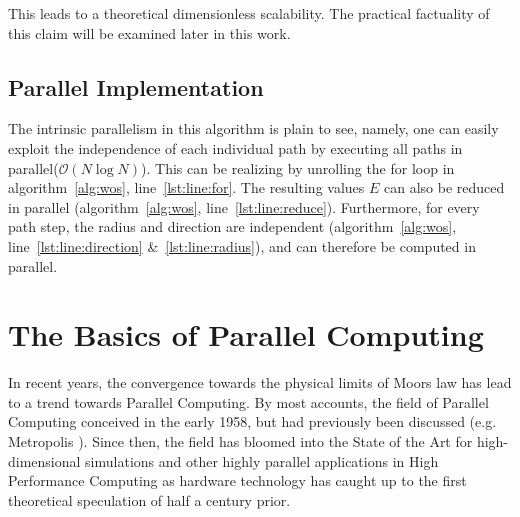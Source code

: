  This leads to a theoretical dimensionless scalability\cite{Bornemann}.  The practical factuality
 of this claim will be examined later in this work.

\subsection{Parallel Implementation}

The intrinsic parallelism in this algorithm is plain to see, namely, one can easily
exploit the independence of each individual path by executing all paths in parallel($\mathcal{O}(N \log{}N)$).
This can be realizing by unrolling the for loop in algorithm~\ref{alg:wos}, line~\ref{lst:line:for}.
The resulting values $E$ can also be reduced in parallel (algorithm~\ref{alg:wos}, line~\ref{lst:line:reduce}).  Furthermore, for every path step,
the radius and direction are independent (algorithm~\ref{alg:wos}, line~\ref{lst:line:direction} \&~\ref{lst:line:radius}),
 and can therefore be computed in parallel. \cite{Muller,DeLaurentis,Bornemann}
\section{The Basics of Parallel Computing}
In recent years, the convergence towards the physical limits of Moors law has lead to a
trend towards Parallel Computing\cite{Kumar}\cite{Markov}.  By most accounts, the
field of Parallel Computing conceived in the early 1958\cite{Gill}, but had previously
been discussed (e.g. Metropolis \cite{Metropolis}). Since then, the field has
 bloomed into the State of the Art for high-dimensional simulations and
 other highly parallel applications in
High Performance Computing as hardware technology has caught up to the first
theoretical speculation of half a century prior. \par

